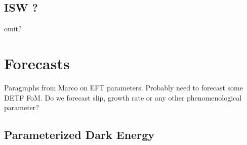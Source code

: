 \subsection{ISW ?}

omit? 

\section{Forecasts}

Paragraphs from Marco on EFT parameters.   Probably need to forecast some DETF FoM.  Do we forecast slip, growth rate or any other phenomenological parameter?

\subsection{Parameterized Dark Energy}




